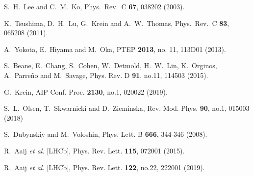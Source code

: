 \documentclass[prd,amsmath,%
twocolumn,floatfix,amssymb, preprintnumbers, linenumbers,nofootinbib, superscriptaddress]{revtex4}
\begin{document}
\begin{thebibliography}{99}
  
  S.~H.~Lee and C.~M.~Ko,
  Phys.\ Rev.\ C {\bf 67}, 038202 (2003). 
  
  K.~Tsushima, D.~H.~Lu, G.~Krein and A.~W.~Thomas,
  Phys.\ Rev.\ C {\bf 83}, 065208 (2011). 

  
  A.~Yokota, E.~Hiyama and M.~Oka,
  PTEP {\bf 2013}, no. 11, 113D01 (2013).

S.~Beane, E.~Chang, S.~Cohen, W.~Detmold, H.~W.~Lin, K.~Orginos, A.~Parreño and M.~Savage,
Phys. Rev. D \textbf{91}, no.11, 114503 (2015).


G.~Krein,
AIP Conf. Proc. \textbf{2130}, no.1, 020022 (2019).

S.~L.~Olsen, T.~Skwarnicki and D.~Zieminska,
Rev. Mod. Phys. \textbf{90}, no.1, 015003 (2018)


S.~Dubynskiy and M.~Voloshin,
Phys. Lett. B \textbf{666}, 344-346 (2008). 


R.~Aaij \textit{et al.} [LHCb],
Phys. Rev. Lett. \textbf{115}, 072001 (2015). 


R.~Aaij \textit{et al.} [LHCb],
Phys. Rev. Lett. \textbf{122}, no.22, 222001 (2019). 



\end{thebibliography}
\end{document}
